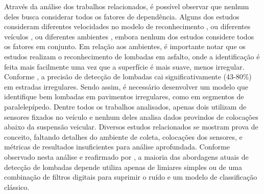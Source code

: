 Através da análise dos trabalhos relacionados, é possível observar que nenhum deles busca considerar todos os fatores de dependência. Alguns dos estudos consideram diferentes velocidades no modelo de reconhecimento  \cite{Rishiwal2016,Aljaafreh2017,Sabir2019}, ou diferentes veículos \cite{Savera2016,Idris2019,Alam2020}, ou diferentes ambientes \cite{Padilla2018}, embora nenhum dos estudos considere todos os fatores em conjunto. Em relação aos ambientes, é importante notar que os estudos realizam o reconhecimento de lombadas em asfalto, onde a identificação é feita mais facilmente uma vez que a superfície é mais suave, menos irregular. Conforme \cite{Alam2020}, a precisão de detecção de lombadas cai significativamente (43-80\%) em estradas irregulares. Sendo assim, é necessário desenvolver um modelo que identifique bem lombadas em pavimentos irregulares, como em segmentos de paralelepípedo. Dentre todos os trabalhos analisados, apenas dois utilizam de sensores fixados no veículo e nenhum deles analisa dados provindos de colocações abaixo da suspensão veicular. Diversos estudos relacionados se mostram prova de conceito, faltando detalhes do ambiente de coleta, colocações dos sensores, e métricas de resultados insuficientes para análise aprofundada. Conforme observado nesta análise e reafirmado por \cite{Padilla2018}, a maioria das abordagens atuais de detecção de lombadas depende utiliza apenas de limiares simples ou de uma combinação de filtros digitais para suprimir o ruído e um modelo de classificação clássico.
